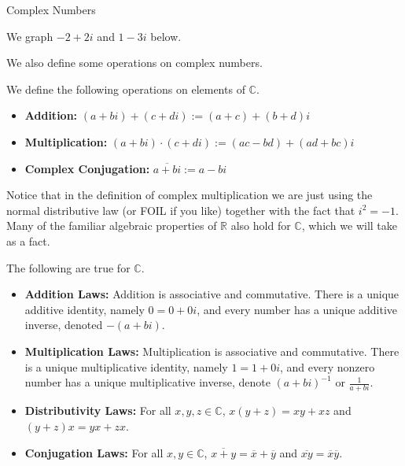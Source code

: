 \begin{section}{Complex Numbers}
\begin{example}
We graph $-2 + 2i$ and  $1 - 3i$ below.
\begin{center}
\end{center}
\end{example}

We also define some operations on complex numbers.

\begin{definition}
We define the following operations on elements of $\mathbb{C}$. 
\begin{itemize}
\item \textbf{Addition:} $(a+bi) + (c+di) := (a+c) + (b+d)i$
\item \textbf{Multiplication:} $(a+bi) \cdot (c+di) := (ac-bd) + (ad+bc)i$
\item \textbf{Complex Conjugation:} $\overline{a+bi} := a-bi$
\end{itemize}
\end{definition}

Notice that in the definition of complex multiplication we are just using the normal distributive law (or FOIL if you like) together with the fact that $i^2 = -1$. Many of the familiar algebraic properties of $\mathbb{R}$ also hold for $\mathbb{C}$, which we will take as a fact.

\begin{fact}\label{fact.ComplexLaws} The following are true for $\mathbb{C}$.
\begin{itemize}
\item \textbf{Addition Laws:} Addition is associative and commutative. There is a unique additive identity, namely $0 = 0 + 0i$, and every number has a unique additive inverse, denoted $-(a+bi)$.
\item \textbf{Multiplication Laws:} Multiplication is associative and commutative. There is a unique multiplicative identity, namely $1 = 1 + 0i$, and every nonzero number has a unique multiplicative inverse, denote $(a+bi)^{-1}$ or $\frac{1}{a+bi}$.
\item \textbf{Distributivity Laws:} For all $x,y,z \in \mathbb{C}$, $x(y+z) = xy+xz$ and $(y+z)x = yx+zx$.
\item \textbf{Conjugation Laws:} For all $x,y \in \mathbb{C}$, $\overline{x+y} = \overline{x} + \overline{y}$ and $\overline{xy} = \overline{x}\overline{y}$.
\end{itemize}
\end{fact}


\end{section}
